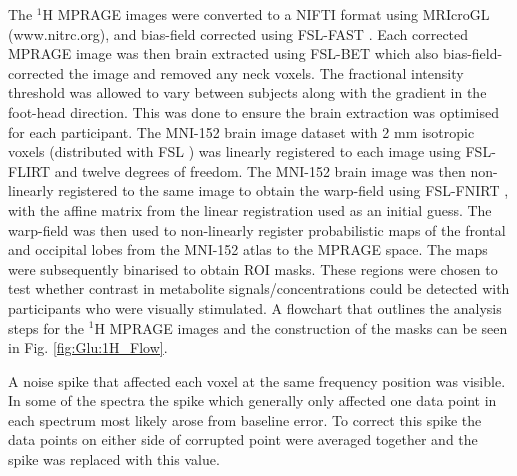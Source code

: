 The $^1$H \ac{MPRAGE} images were converted to a NIFTI format using MRIcroGL (www.nitrc.org), and bias-field corrected using FSL-FAST \cite{Zhang2001SegmentationAlgorithm}. Each corrected \ac{MPRAGE} image was then brain extracted using FSL-BET \cite{Smith2002FastExtraction} which also bias-field-corrected the image and removed any neck voxels. The fractional intensity threshold was allowed to vary between subjects along with the gradient in the foot-head direction. This was done to ensure the brain extraction was optimised for each participant. The MNI-152 brain image dataset with 2 mm isotropic voxels (distributed with FSL \cite{Smith2004AdvancesFSL}) was linearly registered to each image using FSL-FLIRT \cite{Jenkinson2001AImages, Jenkinson2002ImprovedImages} and twelve degrees of freedom. The MNI-152 brain image was then non-linearly registered to the same image to obtain the warp-field using FSL-FNIRT \cite{AnderssonJ2008FNIRT-FMRIBsTool}, with the affine matrix from the linear registration used as an initial guess. The warp-field was then used to non-linearly register probabilistic maps of the frontal and occipital lobes from the MNI-152 atlas to the \ac{MPRAGE} space. The maps were subsequently binarised to obtain \ac{ROI} masks. These regions were chosen to test whether contrast in metabolite signals/concentrations could be detected with participants who were visually stimulated. A flowchart that outlines the analysis steps for the $^1$H MPRAGE images and the construction of the masks can be seen in Fig. \ref{fig:Glu:1H_Flow}.



A noise spike that affected each voxel at the same frequency position was visible. In some of the spectra the spike which generally only affected one data point in each spectrum most likely arose from baseline error. To correct this spike the data points on either side of corrupted point were averaged together and the spike was replaced with this value. 

